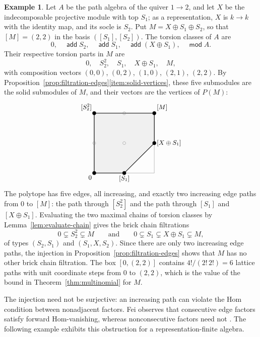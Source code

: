 \documentclass[a4paper,reqno,10pt]{amsart}
\theoremstyle{definition}
\newtheorem{example}[theorem]{Example}
\numberwithin{equation}{section}
\DeclareMathOperator{\modu}{\mathsf{mod}}
\DeclareMathOperator{\add}{\mathsf{add}}
\begin{document}
\begin{example}\label{ex:pentagon}
Let $A$ be the path algebra of the quiver $1\to2$, and let $X$ be the
indecomposable projective module with top $S_1$; as a representation,
$X$ is $k\to k$ with the identity map, and its socle is $S_2$. Put
$M=X\oplus S_1\oplus S_2$, so that $[M]=(2,2)$ in the basis
$([S_1],[S_2])$. The torsion classes of $A$ are
\[
 0,\quad \add S_2,\quad \add S_1,\quad \add(X\oplus S_1),\quad\modu A.
\]
Their respective torsion parts in $M$ are
\[
 0,\quad S_2^2,\quad S_1,\quad X\oplus S_1,\quad M,
\]
with composition vectors $(0,0)$, $(0,2)$, $(1,0)$, $(2,1)$, $(2,2)$.
By Proposition~\ref{prop:filtration-edges}\ref{item:solid-vertices},
these five submodules are the solid submodules of $M$, and their
vectors are the vertices of $P(M)$:
\[
\begin{tikzpicture}[scale=1.5,baseline=(current bounding box.center)]
  \draw[step=1,gray!35,thin] (0,0) grid (2,2);
  \draw[gray!70,thin] (0,0) rectangle (2,2);
  \fill[gray!12] (0,0)--(1,0)--(2,1)--(2,2)--(0,2)--cycle;
  \draw[thick] (0,0)--(0,2)--(2,2);
  \draw[thick] (0,0)--(1,0)--(2,1)--(2,2);
  \foreach \p/\l/\pos in {(0,0)/$0$/below left,(1,0)/$[S_1]$/below,(2,1)/$[X\oplus S_1]$/right,(2,2)/$[M]$/above right,(0,2)/$[S_2^2]$/above left}
    {\fill \p circle (1.8pt); \node[\pos,font=\small] at \p {\l};}
  \foreach \p in {(0,1),(1,1),(1,2)} {\draw[gray] \p circle (1.4pt);}
\end{tikzpicture}
\]
The polytope has five edges, all increasing, and exactly two increasing
edge paths from $0$ to $[M]$: the path through $[S_2^2]$ and the path
through $[S_1]$ and $[X\oplus S_1]$.
Evaluating the two maximal chains of torsion classes by
Lemma~\ref{lem:evaluate-chain} gives the brick chain filtrations
\[
 0\subsetneq S_2^2\subsetneq M
 \qquad\text{and}\qquad
 0\subsetneq S_1\subsetneq X\oplus S_1\subsetneq M,
\]
of types $(S_2,S_1)$ and $(S_1,X,S_2)$.
Since there are only two increasing edge paths, the injection in
Proposition~\ref{prop:filtration-edges} shows that $M$ has no other brick
chain filtration. The box $[0,(2,2)]$ contains $4!/(2!\,2!)=6$ lattice
paths with unit coordinate steps from $0$ to $(2,2)$, which is the value
of the bound in Theorem~\ref{thm:multinomial} for $M$.
\end{example}

The injection need not be surjective: an increasing path can violate
the Hom condition between nonadjacent factors. Fei observes that
consecutive edge factors satisfy forward Hom-vanishing, whereas
nonconsecutive factors need not
\cite[Example~8.8 and the preceding discussion]{Fei}.
The following example exhibits this obstruction for a
representation-finite algebra.
\end{document}

